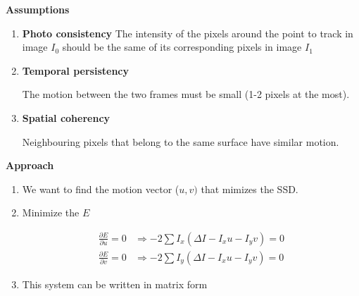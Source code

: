\documentclass[10pt,a4paper]{scrartcl}
\begin{document}
\begin{multicols*}{2}
\begin{itemize}
\textbf{Assumptions}
\begin{enumerate}
\item \textbf{Photo consistency}
The intensity of the pixels around the point to track in image $I_0$ should be the same of its corresponding pixels in image $I_1$

\item \textbf{Temporal persistency}

The motion between the two frames must be small (1-2 pixels at the most).

\item \textbf{Spatial coherency}

Neighbouring pixels that belong to the same surface have similar motion.
\end{enumerate}

\textbf{Approach}

\begin{enumerate}
\item We want to find the motion vector ($u,v)$ that mimizes the SSD.


\item Minimize the $E$

\begin{align*}
\frac{\partial E}{\partial u}=0&\Rightarrow-2\sum I_x(\Delta I-I_xu-I_yv) = 0\\
\frac{\partial E}{\partial v}=0&\Rightarrow-2\sum I_y(\Delta I -I_xu-I_yv)=0
\end{align*}

\item This system can be written in matrix form



\end{enumerate}
\end{itemize}
\end{multicols*}
\end{document}
